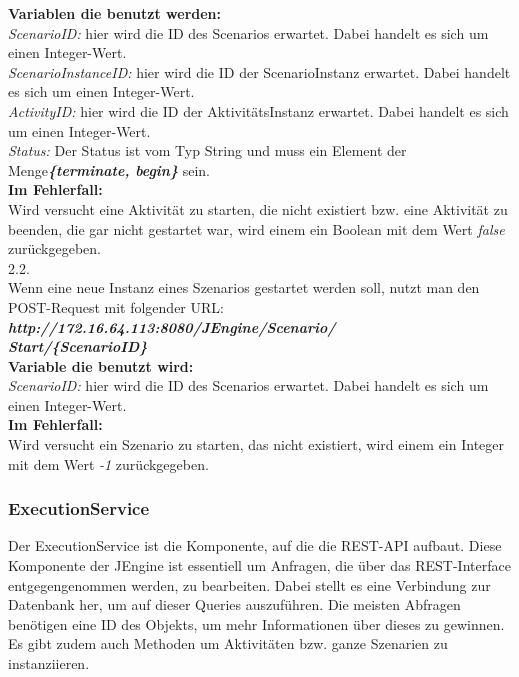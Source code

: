 \documentclass{acm_proc_article-sp}
\begin{document}
\begin{enumerate}
\textbf{Variablen die benutzt werden:}\\
\textit{ScenarioID:} hier wird die ID des Scenarios erwartet. Dabei handelt es sich um einen Integer-Wert.\\
\textit{ScenarioInstanceID:} hier wird die ID der ScenarioInstanz erwartet. Dabei handelt es sich um einen Integer-Wert.\\
\textit{ActivityID:} hier wird die ID der AktivitätsInstanz erwartet. Dabei handelt es sich um einen Integer-Wert.\\
\textit{Status:} Der Status ist vom Typ String und muss ein Element der Menge\textbf{\textit{\{terminate, begin\}}} sein.\\

\textbf{Im Fehlerfall:}\\
Wird versucht eine Aktivität zu starten, die nicht existiert bzw. eine Aktivität zu beenden, die gar nicht gestartet war, wird einem ein Boolean mit dem Wert \textit{false} zurückgegeben.\\

2.2.\\ Wenn eine neue Instanz eines Szenarios gestartet werden soll, nutzt man den POST-Request mit folgender URL:\\
\textit{\textbf{http://172.16.64.113:8080/JEngine/Scenario/\\Start/\{ScenarioID\}}}\\

\textbf{Variable die benutzt wird:}\\
\textit{ScenarioID:} hier wird die ID des Scenarios erwartet. Dabei handelt es sich um einen Integer-Wert.\\

\textbf{Im Fehlerfall:}\\
Wird versucht ein Szenario zu starten, das nicht existiert, wird einem ein Integer mit dem Wert \textit{-1} zurückgegeben.\\
%
%
\end{enumerate}
\subsubsection{ExecutionService}
Der ExecutionService ist die Komponente, auf die die REST-API aufbaut. Diese Komponente der JEngine ist essentiell um Anfragen, die über das REST-Interface entgegengenommen werden, zu bearbeiten. Dabei stellt es eine Verbindung zur Datenbank her, um auf dieser Queries auszuführen. Die meisten Abfragen benötigen eine ID des Objekts, um mehr Informationen über dieses zu gewinnen. Es gibt zudem auch Methoden um Aktivitäten bzw. ganze Szenarien zu instanziieren.
\end{document}
